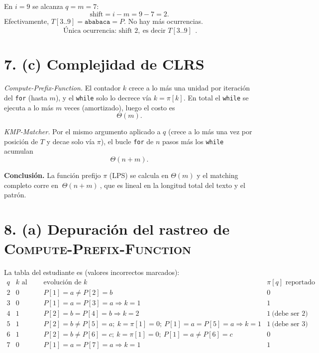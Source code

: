 \documentclass[11pt]{article}
\begin{document}
En \(i=9\) se alcanza \(q=m=7\):
\[
\text{shift} = i - m = 9 - 7 = 2.
\]
Efectivamente, \(T[3..9]=\texttt{ababaca}=P\). No hay más ocurrencias.
\[
\boxed{\ \text{Única ocurrencia: shift } 2,\ \text{es decir } T[3..9]\ }\ .
\]

\section*{7. (c) Complejidad de CLRS}

\emph{Compute-Prefix-Function.} El contador \(k\) crece a lo más una unidad por iteración del \texttt{for} (hasta \(m\)), y el \texttt{while} solo lo decrece vía \(k=\pi[k]\). En total el \texttt{while} se ejecuta a lo más \(m\) veces (amortizado), luego el costo es
\[
\Theta(m).
\]

\emph{KMP-Matcher.} Por el mismo argumento aplicado a \(q\) (crece a lo más una vez por posición de \(T\) y decae solo vía \(\pi\)), el bucle \texttt{for} de \(n\) pasos más los \texttt{while} acumulan
\[
\Theta(n + m).
\]

\smallskip
\noindent\textbf{Conclusión.} La función prefijo \(\pi\) (LPS) se calcula en \(\Theta(m)\) y el matching completo corre en \(\boxed{\ \Theta(n+m)\ }\), que es lineal en la longitud total del texto y el patrón.

\clearpage

\section*{8. (a) Depuración del rastreo de \textsc{Compute-Prefix-Function}}

La tabla del estudiante es (valores incorrectos marcados):
\[
\begin{array}{c|c|c|c}
q & k \text{ al inicio} & \text{evolución de } k & \pi[q] \text{ reportado}\\\hline
2 & 0 & P[1]{=}a \neq P[2]{=}b & 0\\
3 & 0 & P[1]{=}a = P[3]{=}a \Rightarrow k=1 & 1\\
4 & 1 & P[2]{=}b = P[4]{=}b \Rightarrow k=2 & \boxed{1}\ \text{(debe ser } 2\text{)}\\
5 & 1 & P[2]{=}b \neq P[5]{=}a;\ k=\pi[1]=0;\ P[1]{=}a = P[5]{=}a \Rightarrow k=1 & \boxed{1}\ \text{(debe ser } 3\text{)}\\
6 & 1 & P[2]{=}b \neq P[6]{=}c;\ k=\pi[1]=0;\ P[1]{=}a \neq P[6]{=}c & 0\\
7 & 0 & P[1]{=}a = P[7]{=}a \Rightarrow k=1 & 1
\end{array}
\]
\end{document}
